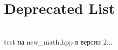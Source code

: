 \chapter{Deprecated List }
\hypertarget{deprecated}{}\label{deprecated}

\begin{DoxyRefList}
\item[File \doxylink{kernel_8h}{kernel.h} ]\hfill \\
\label{deprecated__deprecated000001}%
%
test на {\ttfamily new\+\_\+math.\+hpp} в версии 2... 
\end{DoxyRefList}